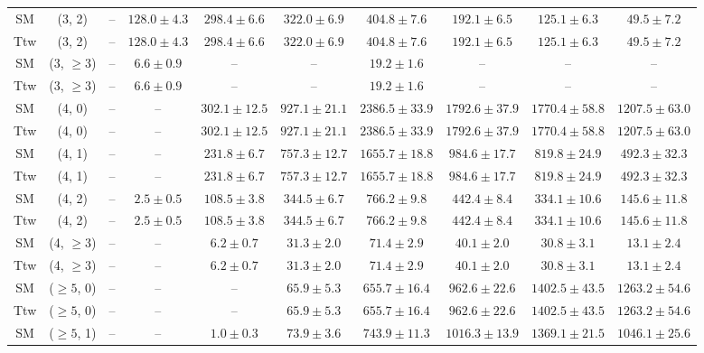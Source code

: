 \begin{table}[h!]
{\begin{tabular}{cccccccccc}
	SM & (3, 2) & -- & $128.0\pm 4.3$ & $298.4\pm 6.6$ & $322.0\pm 6.9$ & $404.8\pm 7.6$ & $192.1\pm 6.5$ & $125.1\pm 6.3$ & $49.5\pm 7.2$ \\[0.5ex] 
	Ttw & (3, 2) & -- & $128.0\pm 4.3$ & $298.4\pm 6.6$ & $322.0\pm 6.9$ & $404.8\pm 7.6$ & $192.1\pm 6.5$ & $125.1\pm 6.3$ & $49.5\pm 7.2$ \\[0.5ex] 
	SM & (3, $\ge3$) & -- & $6.6\pm 0.9$ & -- & -- & $19.2\pm 1.6$ & -- & -- & -- \\[0.5ex] 
	Ttw & (3, $\ge3$) & -- & $6.6\pm 0.9$ & -- & -- & $19.2\pm 1.6$ & -- & -- & -- \\[0.5ex] 
	SM & (4, 0) & -- & -- & $302.1\pm 12.5$ & $927.1\pm 21.1$ & $2386.5\pm 33.9$ & $1792.6\pm 37.9$ & $1770.4\pm 58.8$ & $1207.5\pm 63.0$ \\[0.5ex] 
	Ttw & (4, 0) & -- & -- & $302.1\pm 12.5$ & $927.1\pm 21.1$ & $2386.5\pm 33.9$ & $1792.6\pm 37.9$ & $1770.4\pm 58.8$ & $1207.5\pm 63.0$ \\[0.5ex] 
	SM & (4, 1) & -- & -- & $231.8\pm 6.7$ & $757.3\pm 12.7$ & $1655.7\pm 18.8$ & $984.6\pm 17.7$ & $819.8\pm 24.9$ & $492.3\pm 32.3$ \\[0.5ex] 
	Ttw & (4, 1) & -- & -- & $231.8\pm 6.7$ & $757.3\pm 12.7$ & $1655.7\pm 18.8$ & $984.6\pm 17.7$ & $819.8\pm 24.9$ & $492.3\pm 32.3$ \\[0.5ex] 
	SM & (4, 2) & -- & $2.5\pm 0.5$ & $108.5\pm 3.8$ & $344.5\pm 6.7$ & $766.2\pm 9.8$ & $442.4\pm 8.4$ & $334.1\pm 10.6$ & $145.6\pm 11.8$ \\[0.5ex] 
	Ttw & (4, 2) & -- & $2.5\pm 0.5$ & $108.5\pm 3.8$ & $344.5\pm 6.7$ & $766.2\pm 9.8$ & $442.4\pm 8.4$ & $334.1\pm 10.6$ & $145.6\pm 11.8$ \\[0.5ex] 
	SM & (4, $\ge3$) & -- & -- & $6.2\pm 0.7$ & $31.3\pm 2.0$ & $71.4\pm 2.9$ & $40.1\pm 2.0$ & $30.8\pm 3.1$ & $13.1\pm 2.4$ \\[0.5ex] 
	Ttw & (4, $\ge3$) & -- & -- & $6.2\pm 0.7$ & $31.3\pm 2.0$ & $71.4\pm 2.9$ & $40.1\pm 2.0$ & $30.8\pm 3.1$ & $13.1\pm 2.4$ \\[0.5ex] 
	SM & ($\ge5$, 0) & -- & -- & -- & $65.9\pm 5.3$ & $655.7\pm 16.4$ & $962.6\pm 22.6$ & $1402.5\pm 43.5$ & $1263.2\pm 54.6$ \\[0.5ex] 
	Ttw & ($\ge5$, 0) & -- & -- & -- & $65.9\pm 5.3$ & $655.7\pm 16.4$ & $962.6\pm 22.6$ & $1402.5\pm 43.5$ & $1263.2\pm 54.6$ \\[0.5ex] 
	SM & ($\ge5$, 1) & -- & -- & $1.0\pm 0.3$ & $73.9\pm 3.6$ & $743.9\pm 11.3$ & $1016.3\pm 13.9$ & $1369.1\pm 21.5$ & $1046.1\pm 25.6$ \\[0.5ex] 

\end{tabular}}
\end{table}
